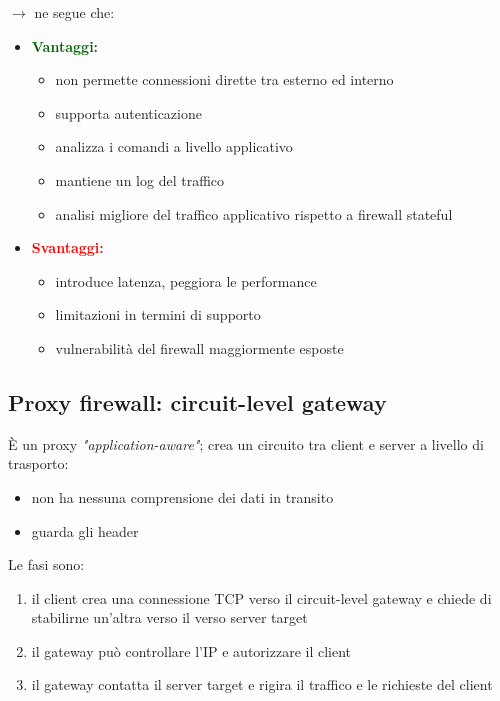\noindent $\rightarrow$ ne segue che:
\begin{itemize}
    \item \textbf{\textcolor{darkgreen}{Vantaggi:}}
    \begin{itemize}
        \item non permette connessioni dirette tra esterno ed interno 
        \item supporta autenticazione
        \item analizza i comandi a livello applicativo 
        \item mantiene un log del traffico 
        \item analisi migliore del traffico applicativo rispetto a firewall stateful 
    \end{itemize}
    \item \textcolor{red}{\textbf{Svantaggi:}}
    \begin{itemize}
        \item introduce latenza, peggiora le performance
        \item limitazioni in termini di supporto
        \item vulnerabilità del firewall maggiormente esposte
    \end{itemize}
\end{itemize}

\subsection{Proxy firewall: circuit-level gateway}
È un proxy \textit{"application-aware"}; crea un circuito tra client e server 
a livello di trasporto:
\begin{itemize}
    \item non ha nessuna comprensione dei dati in transito 
    \item guarda gli header
\end{itemize}

\noindent Le fasi sono:
\begin{enumerate}
    \item il client crea una connessione TCP verso il circuit-level gateway e chiede 
    di stabilirne un'altra verso il verso server target 
    \item il gateway può controllare l'IP e autorizzare il client 
    \item il gateway contatta il server target e rigira il traffico e le richieste del client
\end{enumerate}


